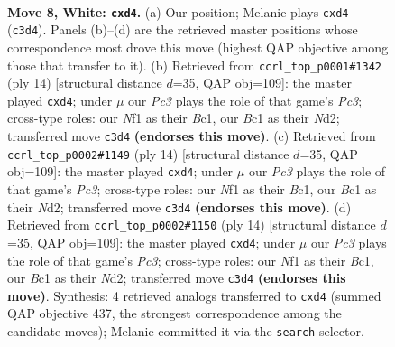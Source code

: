 \documentclass[11pt]{article}
\begin{document}
\begin{figure}[p]\centering
\begin{subfigure}{0.46\textwidth}\centering
\resizebox{\linewidth}{!}{%
\newchessgame
\chessboard[
  setfen={r1bqkb1r/pp1n1ppp/2n1p3/3pP3/3p4/2PB4/PP3PPP/R1BQKNNR w KQkq - 0 8},
  showmover=false,
  pgfstyle=straightmove, color=movearrow, markmove={c3-d4}
]}
\caption{}
\end{subfigure}\hfill
\begin{subfigure}{0.46\textwidth}\centering
\resizebox{\linewidth}{!}{%
\newchessgame
\chessboard[
  setfen={r1bqkb1r/pp1n1ppp/2n1p3/3pP3/3p4/2PB4/PP1NNPPP/R1BQK2R w KQkq - 0 8},
  showmover=false,
  pgfstyle=straightmove, color=movearrow, markmove={c3-d4}
]}
\caption{}
\end{subfigure}
\\[4pt]
\begin{subfigure}{0.46\textwidth}\centering
\resizebox{\linewidth}{!}{%
\newchessgame
\chessboard[
  setfen={r1bqkb1r/pp1n1ppp/2n1p3/3pP3/3p4/2PB4/PP1NNPPP/R1BQK2R w KQkq - 0 8},
  showmover=false,
  pgfstyle=straightmove, color=movearrow, markmove={c3-d4}
]}
\caption{}
\end{subfigure}\hfill
\begin{subfigure}{0.46\textwidth}\centering
\resizebox{\linewidth}{!}{%
\newchessgame
\chessboard[
  setfen={r1bqkb1r/pp1n1ppp/2n1p3/3pP3/3p4/2PB4/PP1NNPPP/R1BQK2R w KQkq - 0 8},
  showmover=false,
  pgfstyle=straightmove, color=movearrow, markmove={c3-d4}
]}
\caption{}
\end{subfigure}
\caption{\textbf{Move 8, White: \texttt{cxd4}.} (a) Our position; Melanie plays \texttt{cxd4} (\texttt{c3d4}). Panels (b)--(d) are the retrieved master positions whose correspondence most drove this move (highest QAP objective among those that transfer to it). (b) Retrieved from \texttt{ccrl\_top\_p0001\#1342} (ply 14) [structural distance $d$=35, QAP obj=109]: the master played \texttt{cxd4}; under $\mu$ our \emph{Pc3} plays the role of that game's \emph{Pc3}; cross-type roles: our \emph{N}f1 as their \emph{B}c1, our \emph{B}c1 as their \emph{N}d2; transferred move \texttt{c3d4} \textbf{(endorses this move)}. (c) Retrieved from \texttt{ccrl\_top\_p0002\#1149} (ply 14) [structural distance $d$=35, QAP obj=109]: the master played \texttt{cxd4}; under $\mu$ our \emph{Pc3} plays the role of that game's \emph{Pc3}; cross-type roles: our \emph{N}f1 as their \emph{B}c1, our \emph{B}c1 as their \emph{N}d2; transferred move \texttt{c3d4} \textbf{(endorses this move)}. (d) Retrieved from \texttt{ccrl\_top\_p0002\#1150} (ply 14) [structural distance $d$=35, QAP obj=109]: the master played \texttt{cxd4}; under $\mu$ our \emph{Pc3} plays the role of that game's \emph{Pc3}; cross-type roles: our \emph{N}f1 as their \emph{B}c1, our \emph{B}c1 as their \emph{N}d2; transferred move \texttt{c3d4} \textbf{(endorses this move)}. Synthesis: 4 retrieved analogs transferred to \texttt{cxd4} (summed QAP objective 437, the strongest correspondence among the candidate moves); Melanie committed it via the \texttt{search} selector.}
\label{fig:thought-m14}
\end{figure}
\end{document}
